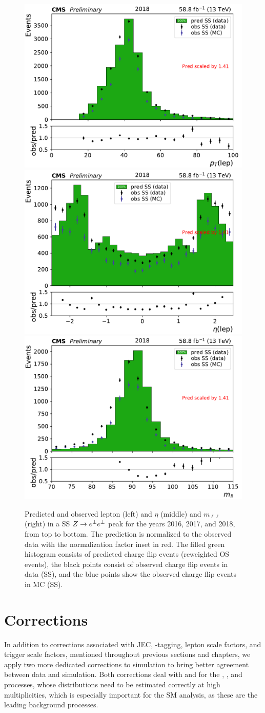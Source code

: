 \begin{figure}[!hbtp]
\includegraphics[width=.31\textwidth]{figs/ftan/flips/y2018/leppt.pdf}
\includegraphics[width=.31\textwidth]{figs/ftan/flips/y2018/lepeta.pdf}
\includegraphics[width=.31\textwidth]{figs/ftan/flips/y2018/mll.pdf} \\
    \caption{  Predicted and observed lepton \pt (left) and $\eta$ (middle) and $m_{\ell\ell}$ (right) in a SS $Z \rightarrow e^\pm e^\pm$ peak
    for the years 2016, 2017, and 2018, from top to bottom.
The prediction is normalized to the observed data with the normalization factor inset in red.
The filled green histogram consists of predicted charge flip events (reweighted OS events),
the black points consist of observed charge flip events in data (SS), and the blue points
show the observed charge flip events in MC (SS).
}
\label{fig:flipclosure}
\end{figure}

\FloatBarrier

\section{Corrections}

In addition to corrections associated with JEC, \PQb-tagging, lepton scale factors,
and trigger scale factors, mentioned throughout previous sections and chapters, we
apply two more dedicated corrections to simulation to bring better agreement between data
and simulation. Both corrections deal with \Njets and \Nbjets for the
\ttW, \ttZ, and \ttH processes,
whose distributions need to be estimated correctly at high multiplicities,
which is especially important for the SM \tttt analysis, as these are
the leading background processes.


